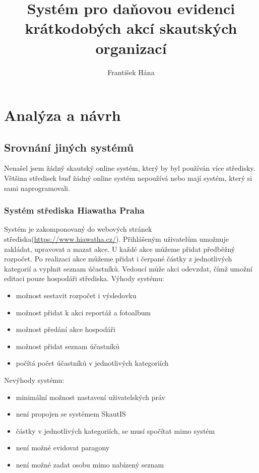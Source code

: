 \documentclass[thesis=B,czech]{FITthesis}[2011/06/14]
\title{Systém pro daňovou evidenci krátkodobých akcí skautských organizací}
\author{František Hána} %
\begin{document}

\begin{introduction}
\end{introduction}

\chapter{Analýza a návrh}
\section{Srovnání jiných systémů}
Nenašel jsem žádný skautský online systém, který by byl používán více středisky. Většina středisek buď žádný online systém nepoužívá nebo mají systém, který si sami naprogramovali.
\subsection{Systém střediska Hiawatha Praha}
Systém je zakomponovaný do webových stránek střediska(\url{https://www.hiawatha.cz/}). Přihlášeným uživatelům umožnuje zakládat, upravovat a mazat akce. U každé akce můžeme přidat předběžný rozpočet. Po realizaci akce můžeme přidat i čerpané částky z jednotlivých kategorií a vyplnit seznam účastníků. Vedoucí může akci odevzdat, čímž umožní editaci pouze hospodáři střediska.
Výhody systému:
\begin{itemize}
	\item možnost sestavit rozpočet i výsledovku
	\item možnost přidat k akci reportáž a fotoalbum
	\item možnost předání akce hospodáři
	\item možnost přidat seznam účastníků
	\item počítá počet účastníků v jednotlivých kategoriích
\end{itemize}
Nevýhody systému:
\begin{itemize}
	\item minimální možnost nastavení uživatelských práv
	\item není propojen se systémem SkautIS
	\item částky v jednotlivých kategoriích, se musí spočítat mimo systém
	\item není možné evidovat paragony
	\item není možné zadat osobu mimo nabízený seznam
\end{itemize}
\end{document}
